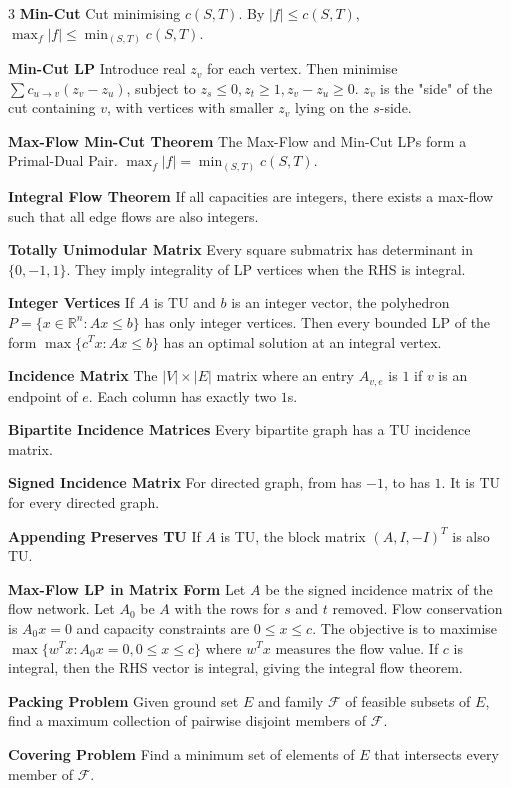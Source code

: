 \documentclass[10pt, landscape]{article}
\begin{document}
\begin{multicols*}{3}
\textbf{Min-Cut} Cut minimising $c(S, T)$. By $|f| \leq c(S, T)$, $\max_f|f| \leq \min_{(S,T)}c(S, T)$.

\textbf{Min-Cut LP} Introduce real $z_v$ for each vertex. Then minimise $\sum c_{u \rightarrow v}(z_v-z_u)$, subject to $z_s \leq 0, z_t \geq 1, z_v-z_u \geq 0$. $z_v$ is the "side" of the cut containing $v$, with vertices with smaller $z_v$ lying on the $s$-side.

\textbf{Max-Flow Min-Cut Theorem} The Max-Flow and Min-Cut LPs form a Primal-Dual Pair. $\max_f|f|=\min_{(S, T)}c(S, T)$.

\textbf{Integral Flow Theorem} If all capacities are integers, there exists a max-flow such that all edge flows are also integers.

\textbf{Totally Unimodular Matrix} Every square submatrix has determinant in $\{0,-1,1\}$. They imply integrality of LP vertices when the RHS is integral.

\textbf{Integer Vertices} If $A$ is TU and $b$ is an integer vector, the polyhedron $P=\{x \in \mathbb{R}^n:Ax\leq b\}$ has only integer vertices. Then every bounded LP of the form $\max\{c^Tx:Ax \leq b\}$ has an optimal solution at an integral vertex.

\textbf{Incidence Matrix} The $|V|\times |E|$ matrix where an entry $A_{v, e}$ is $1$ if $v$ is an endpoint of $e$. Each column has exactly two $1$s.

\textbf{Bipartite Incidence Matrices} Every bipartite graph has a TU incidence matrix.

\textbf{Signed Incidence Matrix} For directed graph, from has $-1$, to has $1$. It is TU for every directed graph.

\textbf{Appending Preserves TU} If $A$ is TU, the block matrix $(A, I, -I)^T$ is also TU.

\textbf{Max-Flow LP in Matrix Form} Let $A$ be the signed incidence matrix of the flow network. Let $A_0$ be $A$ with the rows for $s$ and $t$ removed. Flow conservation is $A_0x=0$ and capacity constraints are $0 \leq x \leq c$. The objective is to maximise $\max\{w^Tx:A_0x=0, 0 \leq x \leq c\}$ where $w^Tx$ measures the flow value. If $c$ is integral, then the RHS vector is integral, giving the integral flow theorem.

\textbf{Packing Problem} Given ground set $E$ and family $\mathcal{F}$ of feasible subsets of $E$, find a maximum collection of pairwise disjoint members of $\mathcal{F}$.

\textbf{Covering Problem} Find a minimum set of elements of $E$ that intersects every member of $\mathcal{F}$.


\end{multicols*}
\end{document}
